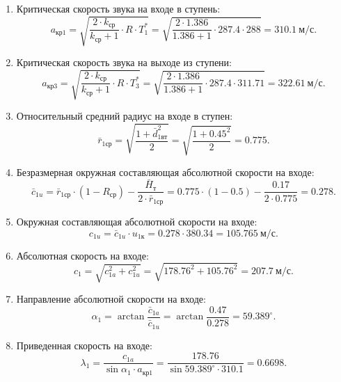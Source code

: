 \documentclass[a4paper,12pt]{article}
\begin{document}
\begin{enumerate}
        \item Критическая скорость звука на входе в ступень:
        \[
            a_{кр1} = \sqrt{ \frac{2 \cdot k_{ср} }{ k_{ср} + 1 } \cdot R \cdot T_1^* } = 
            \sqrt{ 
                \frac{ 
                        2 \cdot 1.386 
                    }{ 
                        1.386 + 1 
                } \cdot 287.4 \cdot 288
                } = 
            310.1\ м/с.
        \]

        \item Критическая скорость звука на выходе из ступени:
        \[
            a_{кр3} = \sqrt{ \frac{2 \cdot k_{ср} }{ k_{ср} + 1 } \cdot R \cdot T_3^* } = 
            \sqrt{ 
                \frac{ 
                        2 \cdot 1.386 
                    }{ 
                        1.386 + 1 
                } \cdot 287.4 \cdot 311.71
                } = 
            322.61\ м/с.
        \] 

        \item Относительный средний радиус на входе в ступен:
        \[
            \bar{r}_{1ср} = \sqrt{ \frac{ 1 + \bar{d}_{1вт}^2 }{ 2 } } = 
            \sqrt{ \frac{ 1 + 0.45 ^ 2 }{ 2 } } = 
            0.775.
        \]

        \item Безразмерная окружная составляющая абсолютной скорости на входе:
        \[
            \bar{c}_{1u} = \bar{r}_{1ср} \cdot (1 - R_{ср}) - \frac{ \bar{H}_т }{ 2 \cdot  \bar{r}_{1ср}} = 
            0.775 \cdot (1 - 0.5) -
            \frac{ 0.17 }{ 2 \cdot  0.775} =
            0.278. 
        \]

        \item Окружная составляющая абсолютной скорости на входе:
        \[
            c_{1u} = \bar{c}_{1u} \cdot u_{1к} = 
            0.278 \cdot 380.34 =
            105.765\ м/с.
        \]

        \item Абсолютная скорость на входе:
        \[
            c_1 = \sqrt{ c_{1a}^2 + c_{1u}^2 } = 
            \sqrt{ 178.76^2 + 105.76^2 } =
            207.7\ м/с.
        \]

        \item Направление абсолютной скорости на входе:
        \[
            \alpha_1 = \arctan{ \frac{ \bar{c}_{1a} }{ \bar{c}_{1u} } } =
             \arctan{ \frac{ 0.47 }{ 0.278 } } = 
             59.389 ^\circ.
        \]

        \item Приведенная скорость на входе:
        \[
            \lambda_1 = \frac{ c_{1a} }{ \sin{\alpha_1} \cdot a_{кр1} } = 
            \frac{ 178.76 }{ \sin{59.389^\circ} \cdot 310.1 } = 
            0.6698.
        \]


\end{enumerate}
\end{document}
